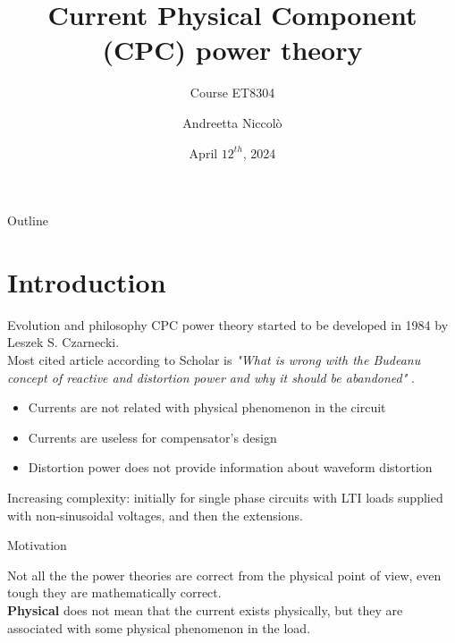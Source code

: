 \documentclass[aspectratio=169]{beamer}
\title{Current Physical Component (CPC) power theory}
\subtitle{Course ET8304}
\author{Andreetta Niccolò}
\date{April $12^{th}$, 2024}
\begin{document}
  \maketitle

  \begin{frame}[fragile]{Outline}
    \tableofcontents
  \end{frame}

  \section{Introduction}
  \begin{frame}{Evolution and philosophy}{\insertsection}
        CPC power theory started to be developed in \textcolor{NTNU_orange}{1984} by Leszek S. Czarnecki.\\
        Most cited article according to Scholar is \textit{"What is wrong with the Budeanu concept of reactive and distortion power and why it should be abandoned"} \cite{6312797}.
        \begin{itemize}
            \item Currents are not related with physical phenomenon in the circuit
            \item Currents are useless for compensator's design
            \item Distortion power does not provide information about waveform distortion
        \end{itemize}
        \textcolor{NTNU_orange}{Increasing complexity}: initially for single phase circuits with LTI loads supplied with non-sinusoidal voltages, and then the extensions.\\
        
  \end{frame}

  \begin{frame}[fragile]{Motivation}{\insertsection}        
    \begin{figure}
    \end{figure}

      Not all the the power theories are correct from the physical point of view, even tough they are mathematically correct.\\

      \textbf{Physical} does not mean that the current exists physically, but they are associated with some physical phenomenon in the load. 
      
  \end{frame}
\end{document}
